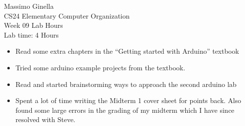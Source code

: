 \documentclass[12pt]{article}
\begin{document}
	\begin{center}
		Massimo Ginella \\
		CS24 Elementary Computer Organization \\
		Week 09 Lab Hours \\
		Lab time: 4 Hours \vspace{0.5cm} \\
	\end{center}
	
	\begin{itemize}
		\item Read some extra chapters in the ``Getting started with Arduino'' textbook
		\item Tried some arduino example projects from the textbook.
		\item Read and started brainstorming ways to approach the second arduino lab
		\item Spent a lot of time writing the Midterm 1 cover sheet for points back. Also found some large errors in the grading of my midterm which I have since resolved with Steve.
	\end{itemize}
	
	
	
\end{document}
